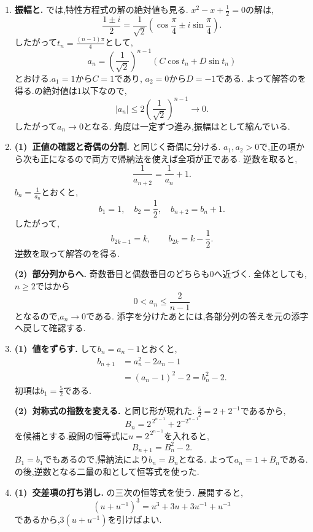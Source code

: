 \begin{enumerate}[label=\textbf{問\arabic*.},leftmargin=3.8em,format=\bookitemlink{practice-special}{solution}{problem}]
    \smallskip
    \noindent \textbf{【別解】}\\
    を一つ進めると,
    \[
      a_{n+3}=a_{n+2}-a_{n+1}=-a_n.
    \]
    さらに3項進めれば$a_{n+6}=a_n$となる.
    特性方程式の解の角度と,直接の式変形による周期の証明が対応している.
  \item \textbf{振幅と.}
    では,特性方程式の解の絶対値も見る.
    $x^2-x+\frac12=0$の解は,
    \[
      \frac{1\pm i}{2}
      =\frac1{\sqrt2}
      \left(\cos\frac\pi4\pm i\sin\frac\pi4\right).
    \]
    したがって$t_n=\frac{(n-1)\pi}{4}$として,
    \[
      a_n=\left(\frac1{\sqrt2}\right)^{n-1}
      (C\cos t_n+D\sin t_n)
    \]
    とおける.$a_1=1$から$C=1$であり,
    $a_2=0$から$D=-1$である.
    よって解答のを得る.の絶対値は$1$以下なので,
    \[
      |a_n|\le2\left(\frac1{\sqrt2}\right)^{n-1}\longrightarrow0.
    \]
    したがって$a_n\to0$となる.
    角度は一定ずつ進み,振幅はとして縮んでいる.
  \item \textbf{(1)~正値の確認と奇偶の分割.}
    と同じく奇偶に分ける.
    $a_1,a_2>0$で,正の項から次も正になるので両方で帰納法を使えば全項が正である.
    逆数を取ると,
    \[
      \frac1{a_{n+2}}=\frac1{a_n}+1.
    \]
    $b_n=\frac1{a_n}$とおくと,
    \[
      b_1=1,\quad b_2=\frac12,\quad b_{n+2}=b_n+1.
    \]
    したがって,
    \[
      b_{2k-1}=k,\qquad b_{2k}=k-\frac12.
    \]
    逆数を取って解答のを得る.

    \smallskip
    \textbf{(2)~部分列からへ.}
    奇数番目と偶数番目のどちらも$0$へ近づく.
    全体としても,$n\ge2$ではから
    \[
      0<a_n\le\frac2{n-1}
    \]
    となるので,$a_n\to0$である.
    添字を分けたあとには,各部分列の答えを元の添字へ戻して確認する.
  \item \textbf{(1)~値をずらす.}
    して$b_n=a_n-1$とおくと,
    \begin{align*}
      b_{n+1}&=a_n^2-2a_n-1\\
      &=(a_n-1)^2-2=b_n^2-2.
    \end{align*}
    初項は$b_1=\frac52$である.

    \smallskip
    \textbf{(2)~対称式の指数を変える.}
    と同じ形が現れた.
    $\frac52=2+2^{-1}$であるから,
    \[
      B_n=2^{\,2^{n-1}}+2^{-2^{n-1}}
    \]
    を候補とする.設問の恒等式に$u=2^{\,2^{n-1}}$を入れると,
    \[
      B_{n+1}=B_n^2-2.
    \]
    $B_1=b_1$でもあるので,帰納法により$b_n=B_n$となる.
    よって$a_n=1+B_n$である.
    の後,逆数となる二量の和として恒等式を使った.
  \item \textbf{(1)~交差項の打ち消し.}
    の三次の恒等式を使う.
    展開すると,
    \[
      (u+u^{-1})^3=u^3+3u+3u^{-1}+u^{-3}
    \]
    であるから,$3(u+u^{-1})$を引けばよい.


\end{enumerate}
